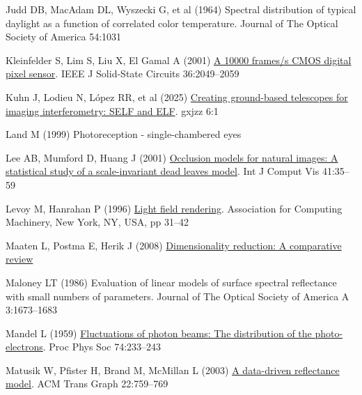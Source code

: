 \documentclass[
  letterpaper,
]{book}
\newlength{\cslhangindent}
\newenvironment{CSLReferences}[2] %
 {\begin{list}{}{%
  \setlength{\itemindent}{0pt}
  \setlength{\leftmargin}{0pt}
  \setlength{\parsep}{0pt}
  \ifodd #1
   \setlength{\leftmargin}{\cslhangindent}
   \setlength{\itemindent}{-1\cslhangindent}
  \fi
  \setlength{\itemsep}{#2\baselineskip}}}
 {\end{list}}
\begin{document}
\begin{CSLReferences}{1}{1}
Judd DB, MacAdam DL, Wyszecki G, et al (1964) Spectral distribution of
typical daylight as a function of correlated color temperature. Journal
of The Optical Society of America 54:1031

Kleinfelder S, Lim S, Liu X, El Gamal A (2001)
\href{http://dx.doi.org/10.1109/4.972156}{A 10000 frames/s {CMOS}
digital pixel sensor}. IEEE J Solid-State Circuits 36:2049--2059

Kuhn J, Lodieu N, López RR, et al (2025)
\href{http://dx.doi.org/10.37188/lam.2025.033}{Creating ground-based
telescopes for imaging interferometry: {SELF} and {ELF}}. gxjzz 6:1

Land M (1999) Photoreception - single-chambered eyes

Lee AB, Mumford D, Huang J (2001)
\href{http://dx.doi.org/10.1023/a:1011109015675}{Occlusion models for
natural images: A statistical study of a scale-invariant dead leaves
model}. Int J Comput Vis 41:35--59

Levoy M, Hanrahan P (1996)
\href{https://doi.org/10.1145/237170.237199}{Light field rendering}.
Association for Computing Machinery, New York, NY, USA, pp 31--42

Maaten L, Postma E, Herik J (2008)
\href{https://www.researchgate.net/profile/Eric-Postma/publication/228657549_Dimensionality_Reduction_A_Comparative_Review/links/0046353a3047fc2863000000/Dimensionality-Reduction-A-Comparative-Review.pdf}{Dimensionality
reduction: A comparative review}

Maloney LT (1986) Evaluation of linear models of surface spectral
reflectance with small numbers of parameters. Journal of The Optical
Society of America A 3:1673--1683

Mandel L (1959)
\href{http://dx.doi.org/10.1088/0370-1328/74/3/301}{Fluctuations of
photon beams: The distribution of the photo-electrons}. Proc Phys Soc
74:233--243

Matusik W, Pfister H, Brand M, McMillan L (2003)
\href{https://dl.acm.org/doi/10.1145/882262.882343}{A data-driven
reflectance model}. ACM Trans Graph 22:759--769


\end{CSLReferences}
\end{document}
